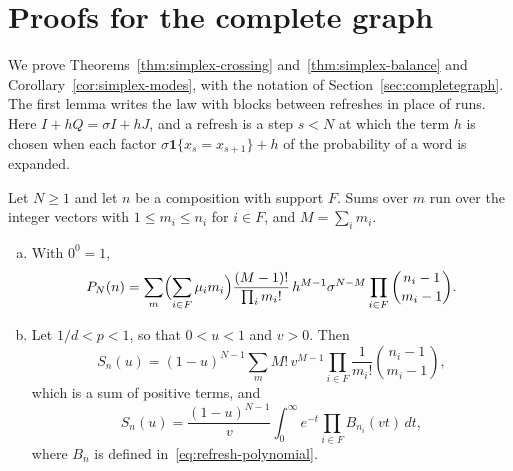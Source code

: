 \section{Proofs for the complete graph}\label{app:complete}

We prove Theorems~\ref{thm:simplex-crossing} and~\ref{thm:simplex-balance} and
Corollary~\ref{cor:simplex-modes}, with the notation of Section~\ref{sec:completegraph}. The
first lemma writes the law with blocks between refreshes in place of runs. Here
$I+hQ=\sigma I+hJ$, and a refresh is a step $s<N$ at which the term $h$ is chosen when each factor
$\sigma\mathbf 1\{x_s=x_{s+1}\}+h$ of the probability of a word is expanded.

\begin{lemma}\label{lem:refresh}
Let $N\ge1$ and let $n$ be a composition with support $F$. Sums over $m$ run over the integer vectors
with $1\le m_i\le n_i$ for $i\in F$, and $M=\sum_im_i$.
\begin{enumerate}[(a)]
\item With $0^0=1$,
\[
P_N(n)=\sum_m\Bigl(\sum_{i\in F}\mu_im_i\Bigr)\frac{(M-1)!}{\prod_im_i!}\,
h^{M-1}\sigma^{N-M}\prod_{i\in F}\binom{n_i-1}{m_i-1}.
\]
\item Let $1/d<p<1$, so that $0<u<1$ and $v>0$. Then
\begin{equation}\label{eq:simplex-positive-sum}
S_n(u)=(1-u)^{N-1}\sum_mM!\,v^{M-1}\prod_{i\in F}\frac1{m_i!}\binom{n_i-1}{m_i-1},
\end{equation}
which is a sum of positive terms, and
\begin{equation}\label{eq:simplex-balance-integral}
S_n(u)=\frac{(1-u)^{N-1}}{v}\int_0^\infty e^{-t}\prod_{i\in F}B_{n_i}(vt)\,dt,
\end{equation}
where $B_n$ is defined in~\eqref{eq:refresh-polynomial}.
\end{enumerate}
\end{lemma}

